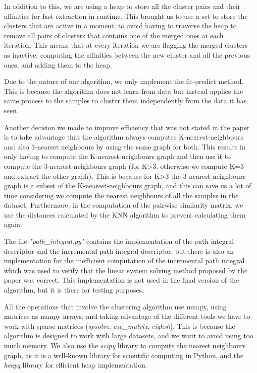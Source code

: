 \documentclass[
	10pt,
	parskip=half-,	
	paper=a4,
	english
	]{scrartcl}
\begin{document}
In addition to this, we are using a heap to store all the cluster pairs and their affinities for fast extraction in runtime. This brought us to use a set to store the clusters that are active in a moment, to avoid having to traverse the heap to remove all pairs of clusters that contains one of the merged ones at each iteration. This means that at every iteration we are flagging the merged clusters as inactive, computing the affinities between the new cluster and all the previous ones, and adding them to the heap.

Due to the nature of our algorithm, we only implement the fit-predict method. This is because the algorithm does not learn from data but instead applies the same process to the samples to cluster them independently from the data it has seen.

Another decision we made to improve efficiency that was not stated in the paper is to take advantage that the algorithm always computes K-nearest-neighbours and also 3-nearest neighbours by using the same graph for both. This results in only having to compute the K-nearest-neighbours graph and then use it to compute the 3-nearest-neighbours graph (for K>3, otherwise we compute K=3 and extract the other graph). This is because for K>3 the 3-nearest-neighbours graph is a subset of the K-nearest-neighbours graph, and this can save us a lot of time considering we compute the nearest neighbours of all the samples in the dataset. Furthermore, in the computation of the pairwise similarity matrix, we use the distances calculated by the KNN algorithm to prevent calculating them again.

The file \textit{"path\_integral.py"} contains the implementation of the path integral descriptor and the incremental path integral descriptor, but there is also an implementation for the inefficient computation of the incremental path integral which was used to verify that the linear system solving method proposed by the paper was correct. This implementation is not used in the final version of the algorithm, but it is there for testing purposes.

All the operations that involve the clustering algorithm use numpy, using matrices as numpy arrays, and taking advantage of the different tools we have to work with sparse matrices (\textit{spsolve}, \textit{csc\_matrix}, \textit{eighsh}). This is because the algorithm is designed to work with large datasets, and we want to avoid using too much memory. We also use the \textit{scipy} library to compute the nearest neighbours graph, as it is a well-known library for scientific computing in Python, and the \textit{heapq} library for efficient heap implementation.
\end{document}
